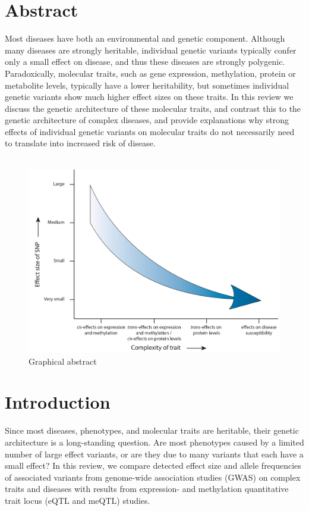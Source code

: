 \section*{Abstract}

Most diseases have both an environmental and genetic component. Although many diseases are strongly heritable, individual genetic variants typically confer only a small effect on disease, and thus these diseases are strongly polygenic. Paradoxically, molecular traits, such as gene expression, methylation, protein or metabolite levels, typically have a lower heritability, but sometimes individual genetic variants show much higher effect sizes on these traits. In this review we discuss the genetic architecture of these molecular traits, and contrast this to the genetic architecture of complex diseases, and provide explanations why strong effects of individual genetic variants on molecular traits do not necessarily need to translate into increased risk of disease.
\\
\\
\begin{figure}[h!]
\includegraphics[scale=0.1]{chapters/chapter2-genetic-architecture/img/AbstractFigureCorrectSizeWhite}
\caption{Graphical abstract}
\end{figure}


\section{Introduction}

Since most diseases, phenotypes, and molecular traits are heritable, their genetic architecture is a long-standing question. Are most phenotypes caused by a limited number of large effect variants, or are they due to many variants that each have a small effect? In this review, we compare detected effect size and allele frequencies of associated variants from genome-wide association studies (GWAS) on complex traits and diseases with results from expression- and methylation quantitative trait locus (eQTL and meQTL) studies.


